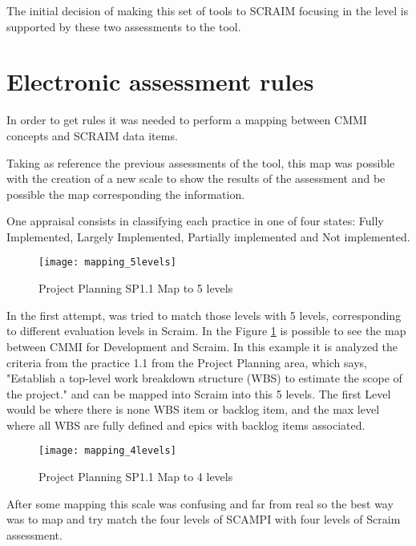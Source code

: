 The initial decision of making this set of tools to SCRAIM focusing in the level is supported by these two assessments to the tool.



\section{Electronic assessment rules} \label{sec:mapping}

In order to get rules it was needed to perform a mapping between CMMI concepts and SCRAIM data items. 

Taking as reference the previous assessments of the tool, this map was possible with the creation of a new scale to show the results of the assessment and be possible the map corresponding the information.

One appraisal consists in classifying each practice in one of four states: Fully Implemented, Largely Implemented, Partially implemented and Not implemented.

\begin{figure}[h]
	\begin{center}
		\leavevmode
		\texttt{[image: mapping\_5levels]}
		\caption{Project Planning SP1.1 Map to 5 levels}
		\label{fig:mapping_5levels}
	\end{center}
\end{figure}

In the first attempt, was tried to match those levels with 5 levels, corresponding to different evaluation levels in Scraim. In the Figure \ref{fig:mapping_5levels} is possible to see the map between CMMI for Development and Scraim. In this example it is analyzed the criteria from the practice 1.1 from the Project Planning area, which says, "Establish a top-level work breakdown structure (WBS) to estimate the scope of the project." and can be mapped into Scraim into this 5 levels. The first Level would be where there is none WBS item or backlog item, and the max level where all WBS are fully defined and epics with backlog items associated. 

\begin{figure}[h]
	\begin{center}
		\leavevmode
		\texttt{[image: mapping\_4levels]}
		\caption{Project Planning SP1.1 Map to 4 levels}
		\label{fig:mapping_4levels}
	\end{center}
\end{figure}

After some mapping this scale was confusing and far from real so the best way was to map and try match the four levels of SCAMPI with four levels of Scraim assessment.

